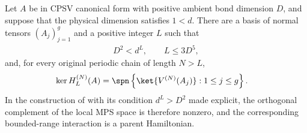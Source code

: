 \begin{lemma}
    \label{thm:cpsv_original_lattice_parent_hamiltonian_range}
    \leanok
    Let $A$ be in CPSV canonical form with positive ambient bond
    dimension $D$, and suppose that the physical dimension satisfies $1<d$.
    There are a basis of normal tensors $(A_j)_{j=1}^{g}$ and a positive
    integer $L$ such that
    \begin{align}
        D^2<d^L,
        \qquad
        L\leq3D^5,
        \label{eq:cpsv_original_lattice_parent_hamiltonian_dimension_range}
    \end{align}
    and, for every original periodic chain of length $N>L$,
    \begin{align}
        \ker H_L^{(N)}(A)
         & =\spn\left\{\ket{V^{(N)}(A_j)}:1\leq j\leq g\right\}.
        \label{eq:cpsv_original_lattice_parent_hamiltonian_range}
    \end{align}
    In the construction of
    \cite[Definition~3.9 and line~527]{Cirac2016MPDO_arXiv} with its
    condition $d^L>D^2$ made explicit, the orthogonal complement of the local
    MPS space is therefore nonzero, and the corresponding bounded-range
    interaction is a parent Hamiltonian.
\end{lemma}

